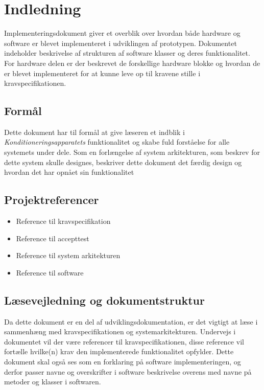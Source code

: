 	\chapter{Indledning}
	Implementeringsdokument giver et overblik over hvordan både hardware og software er blevet implementeret i udviklingen af prototypen. Dokumentet indeholder beskrivelse af strukturen af software klasser og deres funktionalitet. For hardware delen er der beskrevet de forskellige hardware blokke og hvordan de er blevet implementeret for at kunne leve op til kravene stille i kravspecifikationen. 
	
	\section{Formål}
	Dette dokument har til formål at give læseren et indblik i \textit{Konditioneringsapparatets} funktionalitet og skabe fuld forståelse for alle systemets under dele. Som en forlængelse af system arkitekturen, som beskrev for dette system skulle designes, beskriver dette dokument det færdig design og hvordan det har opnået sin funktionalitet
	
	\section{Projektreferencer}
	\begin{itemize}
		\item Reference til kravspecifikation
		\item Reference til accepttest
		\item Reference til system arkitekturen
		\item Reference til software
	\end{itemize}
	
	\section{Læsevejledning og dokumentstruktur}
	Da dette dokument er en del af udviklingsdokumentation, er det vigtigt at læse i sammenhæng med kravspecifikationen og systemarkitekturen. Undervejs i dokumentet vil der være referencer til kravspecifikationen, disse reference vil fortælle hvilke(n) krav den implementerede funktionalitet opfylder. Dette dokument skal også ses som en forklaring på software implementeringen, og derfor passer navne og overskrifter i software beskrivelse overens med navne på metoder og klasser i softwaren. 

